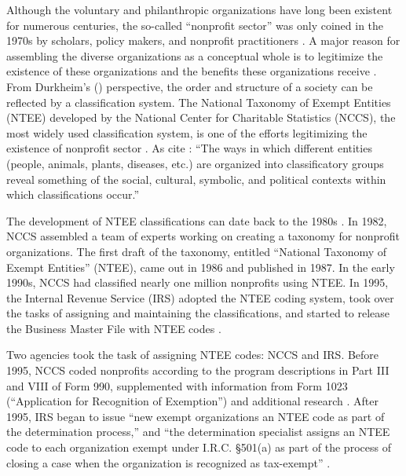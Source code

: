 \documentclass[11pt]{article}
\begin{document}
Although the voluntary and philanthropic organizations have long been existent for numerous centuries, the so-called ``nonprofit sector'' was only coined in the 1970s by scholars, policy makers, and nonprofit practitioners \parencite{HallHistoricalOverviewPhilanthropy2006}. A major reason for assembling the diverse organizations as a conceptual whole is to legitimize the existence of these organizations and the benefits these organizations receive \parencites[54-55]{HallHistoricalOverviewPhilanthropy2006}{BarmanClassificatoryStrugglesNonprofit2013}. From Durkheim's (\citeyear{DurkheimElementaryFormsReligious2012}) perspective, the order and structure of a society can be reflected by a classification system. The National Taxonomy of Exempt Entities (NTEE) developed by the National Center for Charitable Statistics (NCCS), the most widely used classification system, is one of the efforts legitimizing the existence of nonprofit sector \parencite{Hodgkinsonnewresearchplanning1991,HodgkinsonMappingnonprofitsector1990}. As \textcite[105]{BarmanClassificatoryStrugglesNonprofit2013} cite \textcite[601]{ClarkeSimpleTechnologyComplex1996}: ``The ways in which different entities (people, animals, plants, diseases, etc.) are organized into classificatory groups reveal something of the social, cultural, symbolic, and political contexts within which classifications occur.''

The development of NTEE classifications can date back to the 1980s \parencite[8-9, 11]{HodgkinsonMappingnonprofitsector1990}. In 1982, NCCS assembled a team of experts working on creating a taxonomy for nonprofit organizations. The first draft of the taxonomy, entitled ``National Taxonomy of Exempt Entities'' (NTEE), came out in 1986 and published in 1987. In the early 1990s, NCCS had classified nearly one million nonprofits using NTEE. In 1995, the Internal Revenue Service (IRS) adopted the NTEE coding system, took over the tasks of assigning and maintaining the classifications, and started to release the Business Master File with NTEE codes \parencite{USInternalRevenueServiceExemptOrganizationsBusiness2014,USInternalRevenueServiceIRSStaticFiles2013}.

Two agencies took the task of assigning NTEE codes: NCCS and IRS. Before 1995, NCCS coded nonprofits according to the program descriptions in Part III and VIII of Form 990, supplemented with information from Form 1023 (``Application for Recognition of Exemption'') and additional research \parencite[16]{NationalCenterforCharitableStatisticsGuideUsingNCCS2006}. After 1995, IRS began to issue ``new exempt organizations an NTEE code as part of the determination process,'' and ``the determination specialist assigns an NTEE code to each organization exempt under I.R.C. \S 501(a) as part of the process of closing a case when the organization is recognized as tax-exempt'' \parencite[1]{USInternalRevenueServiceIRSStaticFiles2013}.
\end{document}
